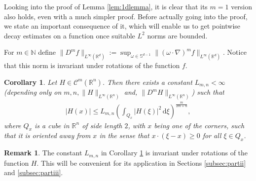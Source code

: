 \documentclass[11pt,a4paper,reqno]{amsart}
\theoremstyle{plain}
\newtheorem{corollary}[proposition]{Corollary}
\theoremstyle{definition}
\newtheorem{remark}[proposition]{Remark}
\begin{document}
Looking into the proof of Lemma \ref{lem:1dlemma}, it is clear that its $m=1$ version also holds, even with a much simpler proof. 
Before actually going into the proof, we state an important consequence of it, which will enable us to get pointwise decay estimates on a function once suitable $L^2$ norms are bounded. 

For $m\in{\mathbb{N}}$ define $\|D^m f\|_{L^{\infty}({\mathbb{R}}^d)}:= \sup_{\omega\in{\mathbb{S}}^{d-1}} \| (\omega\cdot\nabla)^m f\|_{L^{\infty}({\mathbb{R}}^d)}$. Notice that this norm is invariant under rotations of the function $f$. 

\begin{corollary}\label{cor:ddlemma}
	Let $H\in \mathcal{C}^{m}({\mathbb{R}}^n)$. Then there exists a constant $L_{m,n}<\infty$ (depending only on $ m, n, \|H\|_{L^{\infty}({\mathbb{R}}^n)}$ and, $\|D^m H\|_{L^{\infty}({\mathbb{R}}^n)}$) such that
	\begin{align*}
		|H(x)| \leq L_{m,n} \left( \int_{Q_x} |H(\xi)|^2 \,\mathrm{d}\xi \right)^{\frac{m}{2m+n}},
	\end{align*}
	where $Q_x$ is a cube in ${\mathbb{R}}^n$ of side length $2$, with $x$ being one of the corners, such that it is oriented away from $x$ in the sense that $x\cdot (\xi-x) \geq 0$ for all $\xi\in Q_x$.
\end{corollary}

\begin{remark}
The constant $L_{m,n}$ in Corollary \ref{cor:ddlemma} is invariant under rotations of the function $H$. This will be convenient for its application in Sections \ref{subsec:partii} and \ref{subsec:partiii}. 
\end{remark}
\end{document}
